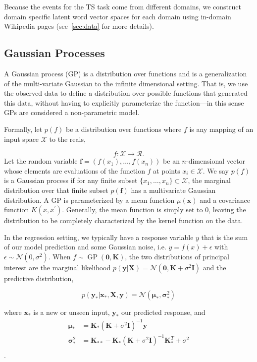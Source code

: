 \documentclass{sig-alternate}
\begin{document}
Because the events for the TS task come from different domains, we construct
domain specific latent word vector spaces for each domain using in-domain 
Wikipedia pages (see~\cref{sec:data} for more details).

\subsection{Gaussian Processes}

A Gaussian process (GP) is a distribution over functions and is a 
generalization of the multi-variate Gaussian to the infinite dimensional
setting. That is, we use the observed data to define a distribution over 
possible functions that generated this data, without having to explicitly 
parameterize the function---in this sense GPs are considered 
a non-parametric model.

Formally, let $p(f)$ be a distribution over functions where $f$ is any mapping
of an input space $\mathcal{X}$ to the reals,

$$f: \mathcal{X} \rightarrow \mathcal{R}.$$ 
Let the random variable $\mathbf{f} = (f(x_1),\ldots,f(x_n) )$ be
 an $n$-dimensional vector whose elements are evaluations of the function $f$
at points $x_i \in \mathcal{X}$.
We say $p(f)$ is a Gaussian process if for any finite subset 
$\{x_1,\ldots,x_n\} \subset \mathcal{X}$, the marginal distribution over 
that finite subset $p(\mathbf{f})$ has a multivariate Gaussian distribution.
A GP is parameterized by a mean function $\mu(\mathbf{x})$ and a 
covariance function $K(x,x^\prime)$. Generally, the mean function is simply
set to 0, leaving the distribution to be completely characterized by the
kernel function on the data.

In the regression setting, we typically have a response variable $y$ that
is the sum of our model prediction  and 
some Gaussian noise, i.e. $y = f(x) + \epsilon$ with 
$\epsilon \sim \mathcal{N}(0, \sigma^2)$. When
$f \sim \operatorname{GP}(\mathbf{0}, \mathbf{K})$, the
two distributions
of principal interest are the marginal likelihood
$p(\mathbf{y}|\mathbf{X}) = 
\mathcal{N}(\mathbf{0},\mathbf{K} + \sigma^2\mathbf{I})$ and the predictive
distribution,

$$p(\mathbf{y_*}|\mathbf{x_*},\mathbf{X},\mathbf{y}) =
\mathcal{N}(\boldsymbol{\mu}_*, \boldsymbol{\sigma}^2_*) $$

where $\mathbf{x_*}$ is a new or unseen input, $\mathbf{y_*}$ our predicted
response, and
\begin{align*}
\boldsymbol{\mu}_* & = \mathbf{K_*}(\mathbf{K} + \sigma^2\mathbf{I})^{-1}\mathbf{y} \\
\boldsymbol{\sigma}^2_* & 
= \mathbf{K}_{**} - \mathbf{K}_*(\mathbf{K} + \sigma^2\mathbf{I})^{-1}
\mathbf{K}_*^T + \sigma^2\\
\end{align*}.
\end{document}
